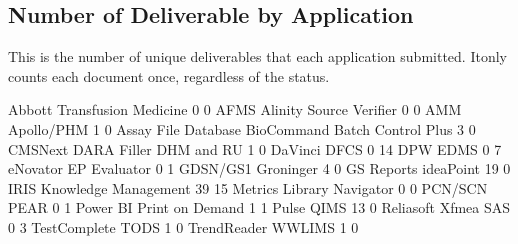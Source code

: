 \documentclass{article}
\begin{document}
\subsection{Number of Deliverable by Application}
This is the number of unique deliverables that each application submitted. Itonly counts
each document once, regardless of the status.
\begin{Schunk}
\begin{Soutput}
                                Abbott Transfusion Medicine 
                            0                             0 
                         AFMS       Alinity Source Verifier 
                            0                             0 
                          AMM                    Apollo/PHM 
                            1                             0 
          Assay File Database BioCommand Batch Control Plus 
                            3                             0 
                      CMSNext        DARA Filler DHM and RU 
                            1                             0 
                      DaVinci                          DFCS 
                            0                            14 
                          DPW                          EDMS 
                            0                             7 
                     eNovator                  EP Evaluator 
                            0                             1 
                     GDSN/GS1                     Groninger 
                            4                             0 
                   GS Reports                     ideaPoint 
                           19                             0 
                         IRIS          Knowledge Management 
                           39                            15 
              Metrics Library                     Navigator 
                            0                             0 
                      PCN/SCN                          PEAR 
                            0                             1 
                     Power BI               Print on Demand 
                            1                             1 
                        Pulse                          QIMS 
                           13                             0 
              Reliasoft Xfmea                           SAS 
                            0                             3 
                 TestComplete                          TODS 
                            1                             0 
                  TrendReader                        WWLIMS 
                            1                             0 
\end{Soutput}
\end{Schunk}
\end{document}
